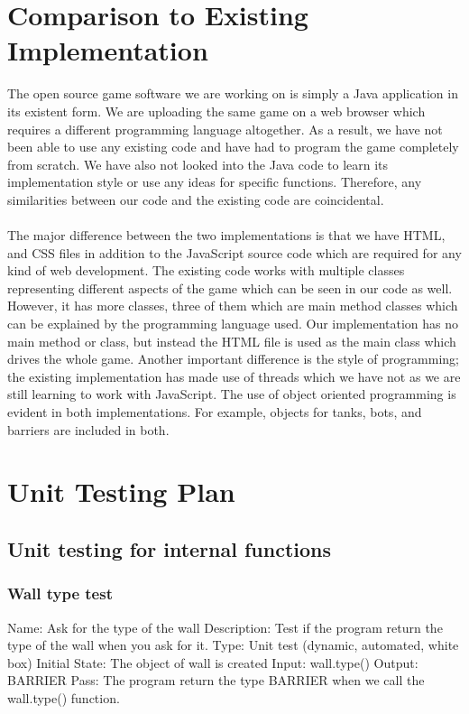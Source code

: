 \documentclass{article}
\begin{document}
\section{Comparison to Existing Implementation}
The open source game software we are working on is simply a Java application in its existent form. We are uploading the same game on a web browser which requires a different programming language altogether. As a result, we have not been able to use any existing code and have had to program the game completely from scratch. We have also not looked into the Java code to learn its implementation style or use any ideas for specific functions. Therefore, any similarities between our code and the existing code are coincidental. \\ \\
The major difference between the two implementations is that we have HTML, and CSS files in addition to the JavaScript source code which are required for any kind of web development. The existing code works with multiple classes representing different aspects of the game which can be seen in our code as well. However, it has more classes, three of them which are main method classes which can be explained by the programming language used. Our implementation has no main method or class, but instead the HTML file is used as the main class which drives the whole game. Another important difference is the style of programming; the existing implementation has made use of threads which we have not as we are still learning to work with JavaScript. The use of object oriented programming is evident in both implementations. For example, objects for tanks, bots, and barriers are included in both. 





\section{Unit Testing Plan}
\subsection{Unit testing for internal functions}
\subsubsection{Wall type test}
Name:  Ask for the type of the wall\newline
Description: Test if the program return the type of the wall when you ask for it. \newline
Type: Unit test (dynamic, automated, white box) \newline
Initial State:  The object of wall is created \newline
Input: wall.type()\newline
Output: BARRIER  \newline
Pass:   The program return the type BARRIER when we call the wall.type() function. \newline
\end{document}
